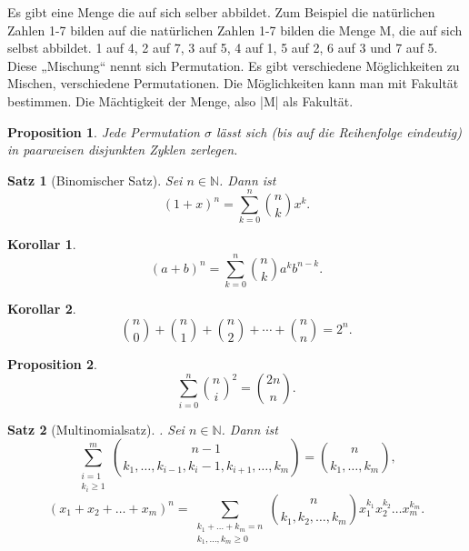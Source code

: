 \documentclass[12pt, twoside]{article}
\newcommand{\N}{\mathbb{N}}
\newtheorem{Sa}{Satz}[subsection]
\newtheorem{Kor}{Korollar}[subsection]
\newtheorem{Prop}{Proposition}[subsection]
\begin{document}
Es gibt eine Menge die auf sich selber abbildet. Zum Beispiel die natürlichen Zahlen 1-7 bilden auf die natürlichen Zahlen 1-7 
bilden die Menge M, die auf sich selbst abbildet. 1 auf 4, 2  auf 7, 3 auf 5, 4 auf 1, 5 auf 2, 6 auf 3 und 7 auf 5. Diese „Mischung“ 
nennt sich Permutation.  Es gibt verschiedene Möglichkeiten zu Mischen, verschiedene Permutationen. Die Möglichkeiten kann man mit Fakultät bestimmen. 
Die Mächtigkeit der Menge, also |M| als Fakultät.

\begin{Prop} 
Jede Permutation $\sigma$ lässt sich (bis auf die Reihenfolge eindeutig) in paarweisen disjunkten Zyklen zerlegen.
\end{Prop}

\begin{Sa}[Binomischer Satz]
Sei $n \in \N$. Dann ist
$$
(1+x)^n= \sum_{k=0}^{n} \binom{n}{k}x^k.
$$
\end{Sa}

\begin{Kor}
$$
(a+b)^n= \sum_{k=0}^{n} \binom{n}{k}a^kb^{n-k}.
$$
\end{Kor}


\begin{Kor}
$$
\binom{n}{0}+\binom{n}{1}+\binom{n}{2}+\cdots+\binom{n}{n}=2^n.
$$
\end{Kor}

\begin{Prop}
$$
\sum_{i=0}^{n}\binom{n}{i}^2=\binom{2n}{n}.
$$
\end{Prop}

\begin{Sa}[Multinomialsatz]. Sei $n \in \N$. Dann ist
$$
\sum_{\substack{i=1 \\ k_i\ge1}}^{m}\binom{n-1}{k_1, \dots, k_{i-1}, k_i-1, k_{i+1}, \dots, k_m} = \binom{n}{k_1, \dots, k_m}, 
$$
$$
(x_1+x_2+ \ldots +x_m)^n = \sum_{\substack{k_1+\ldots+k_m=n \\ k_1, \dots, k_m\ge0}} \binom{n}{k_1, k_2, \dots, k_m}x_1^{k_1} x_2^{k_2} \ldots x_m^{k_m} .
$$
\end{Sa}
\end{document}
